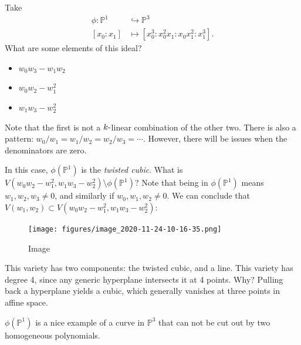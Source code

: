 \begin{example}[?]

Take
\begin{align*}  
\phi: {\mathbb{P}}^1 &\hookrightarrow{\mathbb{P}}^3 \\
[x_0: x_1] &\mapsto [x_0^3: x_0^2 x_1 : x_0 x_1^2: x_1^3]
.\end{align*}
What are some elements of this ideal?

\begin{itemize}
\tightlist
\item
  \(w_0 w_3 - w_1 w_2\)
\item
  \(w_0 w_2 - w_1^2\)
\item
  \(w_1 w_3 - w_2^2\)
\end{itemize}

Note that the first is not a \(k{\hbox{-}}\)linear combination of the
other two. There is also a pattern:
\(w_0/w_1 = w_1 / w_2 = w_2/w_3 = \cdots\). However, there will be
issues when the denominators are zero.

In this case, \(\phi({\mathbb{P}}^1)\) is the \emph{twisted cubic}. What
is
\(V(w_0 w_2 - w_1^2, w_1 w_3 - w_2^2) \setminus\phi({\mathbb{P}}^1)\)?
Note that being in \(\phi({\mathbb{P}}^1)\) means
\(w_1, w_2, w_3 \neq 0\), and similarly if \(w_0, w_1, w_2 \neq 0\). We
can conclude that
\(V(w_1, w_2) \subset V(w_0 w_2 - w_1^2, w_1 w_3 - w_2^2)\):

\begin{figure}
\centering
\texttt{[image: figures/image\_2020-11-24-10-16-35.png]}
\caption{Image}
\end{figure}

This variety has two components: the twisted cubic, and a line. This
variety has degree 4, since any generic hyperplane intersects it at 4
points. Why? Pulling back a hyperplane yields a cubic, which generally
vanishes at three points in affine space.

\end{example}

\begin{remark}

\(\phi({\mathbb{P}}^1)\) is a nice example of a curve in
\({\mathbb{P}}^3\) that can not be cut out by two homogeneous
polynomials.

\end{remark}

